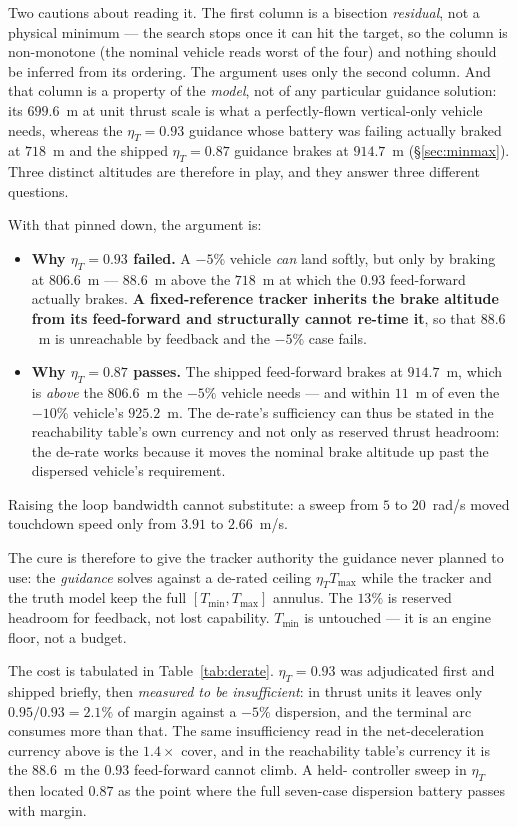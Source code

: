 \documentclass[11pt]{article}
\newcommand{\Tmin}{T_{\min}}
\newcommand{\Tmax}{T_{\max}}
\newcommand{\etaT}{\eta_T}
\begin{document}
Two cautions about reading it. The first column is a bisection
\emph{residual}, not a physical minimum --- the search stops once it can
hit the target, so the column is non-monotone (the nominal vehicle reads
worst of the four) and nothing should be inferred from its ordering. The
argument uses only the second column. And that column is a property of the
\emph{model}, not of any particular guidance solution: its $699.6$~m at
unit thrust scale is what a perfectly-flown vertical-only vehicle needs,
whereas the $\etaT = 0.93$ guidance whose battery was failing actually
braked at $718$~m and the shipped $\etaT = 0.87$ guidance brakes at
$914.7$~m (\S\ref{sec:minmax}). Three distinct altitudes are therefore in
play, and they answer three different questions.

With that pinned down, the argument is:
%
\begin{itemize}
\item \textbf{Why $\etaT = 0.93$ failed.} A $-5\%$ vehicle \emph{can} land
softly, but only by braking at $806.6$~m --- $88.6$~m above the $718$~m at
which the $0.93$ feed-forward actually brakes. \textbf{A fixed-reference
tracker inherits the brake altitude from its feed-forward and structurally
cannot re-time it}, so that $88.6$~m is unreachable by feedback and the
$-5\%$ case fails.
\item \textbf{Why $\etaT = 0.87$ passes.} The shipped feed-forward brakes
at $914.7$~m, which is \emph{above} the $806.6$~m the $-5\%$ vehicle needs
--- and within $11$~m of even the $-10\%$ vehicle's $925.2$~m. The
de-rate's sufficiency can thus be stated in the reachability table's own
currency and not only as reserved thrust headroom: the de-rate works
because it moves the nominal brake altitude up past the dispersed
vehicle's requirement.
\end{itemize}
%
Raising the loop bandwidth cannot substitute: a sweep from $5$ to
$20$~rad/s moved touchdown speed only from $3.91$ to $2.66$~m/s.

The cure is therefore to give the tracker authority the guidance never
planned to use: the \emph{guidance} solves against a de-rated ceiling
$\etaT\Tmax$ while the tracker and the truth model keep the full
$[\Tmin, \Tmax]$ annulus. The $13\%$ is reserved headroom for feedback, not
lost capability. $\Tmin$ is untouched --- it is an engine floor, not a
budget.

The cost is tabulated in Table~\ref{tab:derate}. $\etaT = 0.93$ was adjudicated first and shipped briefly, then \emph{measured
to be insufficient}: in thrust units it leaves only $0.95/0.93 = 2.1\%$ of
margin against a $-5\%$ dispersion, and the terminal arc consumes more than
that. The same insufficiency read in the net-deceleration currency above is
the $1.4\times$ cover, and in the reachability table's currency it is the
$88.6$~m the $0.93$ feed-forward cannot climb. A held-
controller sweep in $\etaT$ then located $0.87$ as the point where the full
seven-case dispersion battery passes with margin.
\end{document}
